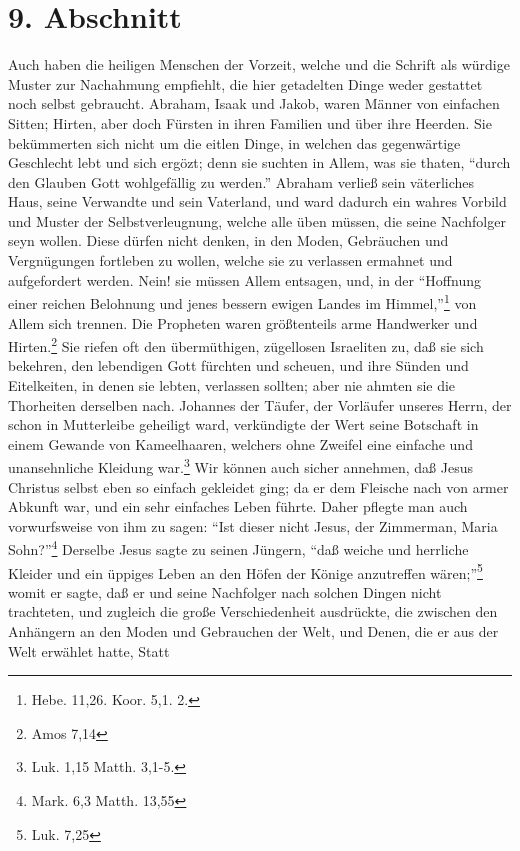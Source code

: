 \section{9. Abschnitt} \label{kap14_ab9}

Auch haben die heiligen Menschen der Vorzeit, welche und die Schrift als würdige
Muster zur Nachahmung empfiehlt, die hier getadelten Dinge weder gestattet noch
selbst gebraucht. Abraham, Isaak und Jakob, waren Männer von einfachen Sitten;
Hirten, aber doch Fürsten in ihren Familien und über ihre Heerden. Sie
bekümmerten sich nicht um die eitlen Dinge, in welchen das gegenwärtige
Geschlecht lebt und sich ergözt; denn sie suchten in Allem, was sie thaten,
"`durch den Glauben Gott wohlgefällig zu werden."' Abraham verließ sein
väterliches Haus, seine Verwandte und sein Vaterland, und ward dadurch ein
wahres Vorbild und Muster der Selbstverleugnung, welche alle üben müssen, die
seine Nachfolger seyn wollen. Diese dürfen nicht denken, in den Moden,
Gebräuchen und Vergnügungen fortleben zu wollen, welche sie zu verlassen
ermahnet und aufgefordert werden. Nein! sie müssen Allem entsagen, und, in der
"`Hoffnung einer reichen Belohnung und jenes bessern ewigen Landes im
Himmel,"'\footnote{Hebe. 11,26. Koor. 5,1. 2.} von Allem sich trennen. Die
Propheten waren größtenteils arme Handwerker und Hirten.\footnote{Amos 7,14} Sie
riefen oft den übermüthigen, zügellosen Israeliten zu, daß sie sich bekehren,
den lebendigen Gott fürchten und scheuen, und ihre Sünden und Eitelkeiten, in
denen sie lebten, verlassen sollten; aber nie ahmten sie die Thorheiten
derselben nach. Johannes der Täufer, der Vorläufer unseres Herrn, der schon in
Mutterleibe geheiligt ward, verkündigte der Wert seine Botschaft in einem
Gewande von Kameelhaaren, welchers ohne Zweifel eine einfache und unansehnliche
Kleidung war.\footnote{Luk. 1,15 Matth. 3,1-5.} Wir können auch sicher annehmen,
daß Jesus Christus selbst eben so einfach gekleidet ging; da er dem Fleische
nach von armer Abkunft war, und ein sehr einfaches Leben führte. Daher pflegte
man auch vorwurfsweise von ihm zu sagen: "`Ist dieser nicht Jesus, der
Zimmerman, Maria Sohn?"'\footnote{Mark. 6,3 Matth. 13,55} Derselbe Jesus sagte
zu seinen Jüngern, "`daß weiche und herrliche Kleider und ein üppiges Leben an
den Höfen der Könige anzutreffen wären;"'\footnote{Luk. 7,25} womit er sagte,
daß er und seine Nachfolger nach solchen Dingen nicht trachteten, und zugleich
die große Verschiedenheit ausdrückte, die zwischen den Anhängern an den Moden
und Gebrauchen der Welt, und Denen, die er aus der Welt erwählet hatte, Statt
